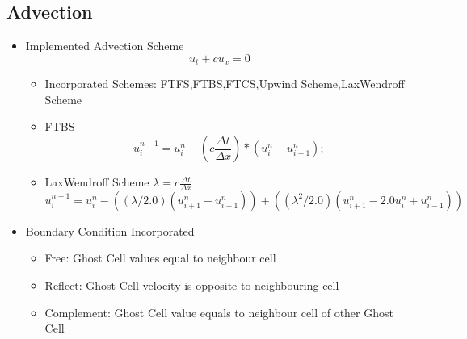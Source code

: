 \documentclass{beamer}
\begin{document}
\subsection{Advection}
\begin{frame}
	    \begin{itemize}
\item Implemented Advection Scheme
\begin{equation}
            u_t + c u_x = 0
\end{equation}
	     \begin{itemize}
\item Incorporated Schemes: FTFS,FTBS,FTCS,Upwind Scheme,LaxWendroff Scheme
\item FTBS
\begin{equation*}
            u^{n+1}_i = u^n_i - (c \frac{ \Delta t}{ \Delta x} ) * (u^n_i - u^n_{i-1});
\end{equation*}
\item LaxWendroff Scheme  $\lambda = c  \frac{\Delta t}{ \Delta x} $
\begin{equation*}	    
            u^{n+1}_i = u^n_i - ( ( \lambda / 2.0 ) (u^n_{i+1} - u^n_{i-1})) + ( ( \lambda^2 / 2.0)  (u^n_{i+1} 
- 2.0  u^n_i + u^n_{i-1}) )
\end{equation*}

	  \end{itemize}
% 

\item Boundary Condition Incorporated
\begin{itemize}  
\item Free: Ghost Cell values equal to neighbour cell
\item Reflect: Ghost Cell velocity is opposite to neighbouring cell
\item Complement: Ghost Cell value equals to neighbour cell of other Ghost Cell
 \end{itemize}  
\end{itemize}  
\end{frame}
\end{document}
